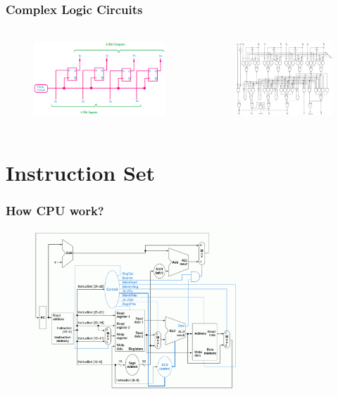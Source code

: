 \documentclass{beamer}
\begin{document}
\begin{frame}
\frametitle{Complex Logic Circuits}
\begin{columns}
\begin{figure}[h!]
  \includegraphics[height=3cm]{img/register.png}
\end{figure}
\begin{figure}[h!]
  \includegraphics[height=3cm]{img/alu.png}
\end{figure}
\end{columns}
\end{frame}

\section{Instruction Set}

\begin{frame}
\frametitle{How CPU work?}
\begin{figure}[h!]
  \includegraphics[height=6cm]{img/single_cycle_datapath.png}
\end{figure}

\end{frame}
\end{document}
